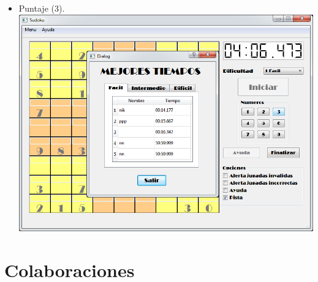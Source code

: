 \documentclass[12pt,oneside]{book}
\begin{document}
\begin{itemize}
\item   Puntaje (3).
	\includegraphics[width=1.10\textwidth]{./imagenes/puntaje.png}
\end{itemize}

\chapter{Colaboraciones}
\end{document}
